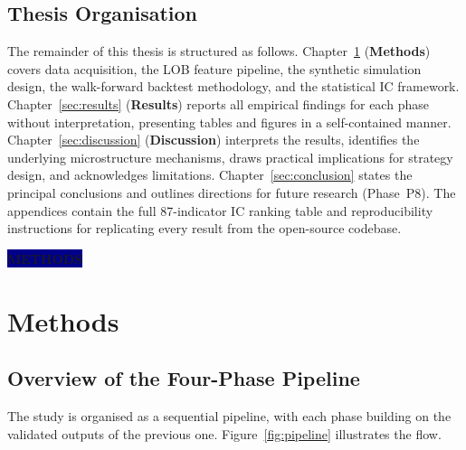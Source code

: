 \documentclass[12pt,a4paper]{article}
\theoremstyle{definition}
\theoremstyle{remark}
\newcommand{\sectionlabel}[1]{%
  \begin{center}
    \colorbox{darkblue}{\color{white}\bfseries\large\quad #1 \quad}
  \end{center}
  \vspace{4pt}
}
\begin{document}
\subsection{Thesis Organisation}

The remainder of this thesis is structured as follows.
Chapter~\ref{sec:methods} (\textbf{Methods}) covers data acquisition,
the LOB feature pipeline, the synthetic simulation design, the
walk-forward backtest methodology, and the statistical IC framework.
Chapter~\ref{sec:results} (\textbf{Results}) reports all empirical
findings for each phase without interpretation, presenting tables
and figures in a self-contained manner.
Chapter~\ref{sec:discussion} (\textbf{Discussion}) interprets the
results, identifies the underlying microstructure mechanisms, draws
practical implications for strategy design, and acknowledges
limitations.
Chapter~\ref{sec:conclusion} states the principal conclusions and
outlines directions for future research (Phase~P8).
The appendices contain the full 87-indicator IC ranking table and
reproducibility instructions for replicating every result from
the open-source codebase.

\newpage
\sectionlabel{METHODS}

\section{Methods}
\label{sec:methods}

\subsection{Overview of the Four-Phase Pipeline}
\label{sec:pipeline_overview}

The study is organised as a sequential pipeline, with each phase
building on the validated outputs of the previous one.
Figure~\ref{fig:pipeline} illustrates the flow.
\end{document}

